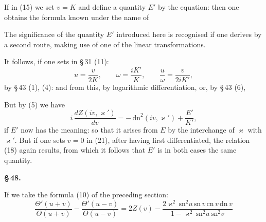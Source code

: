 
If in (15) we set $v=K$ and define a quantity $E'$ by
the equation:
then one obtains the formula known under the name of 

The significance of the quantity $E'$ introduced here is recognised
if one derives  by a second route,
making use of one of the linear transformations.

It follows, if one sets in \S\,31 (11):
\[
u = \frac{v}{2K}, \qquad \omega = \frac{iK'}{K}, \qquad \frac{u}{\omega} = \frac{v}{2iK'},
\]
by \S\,43 (1), (4):
and from this, by logarithmic differentiation,
or, by \S\,43 (6),

But by (5) we have
\[
i\,\frac{dZ(iv,\varkappa')}{dv} = -\,\mathrm{dn}^2(iv,\varkappa') + \frac{E'}{K'},
\]
if $E'$ now has the meaning:
so that it arises from $E$ by the interchange of $\varkappa$ with $\varkappa'$. But if one
sets $v=0$ in (21), after having first differentiated, the relation (18)
again results, from which it follows that $E'$ is in both
cases the same quantity.

\begin{center}
\textbf{\S\,48. }
\end{center}

If we take the formula (10) of the preceding section:
\[
\frac{\Theta'(u+v)}{\Theta(u+v)} - \frac{\Theta'(u-v)}{\Theta(u-v)} = 2Z(v) - \frac{2\varkappa^2\,\mathrm{sn}^2 u\,\mathrm{sn}\,v\,\mathrm{cn}\,v\,\mathrm{dn}\,v}{1 - \varkappa^2\,\mathrm{sn}^2 u\,\mathrm{sn}^2 v}
\]
